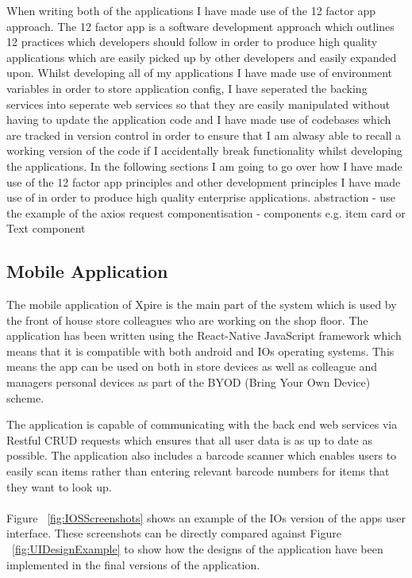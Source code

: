 \documentclass[a4paper,11pt]{report}
\begin{document}
When writing both of the applications I have made use of the 12 factor app approach. The 12 factor app is a software development approach which outlines 12 practices which developers should follow in order to produce high quality applications which are easily picked up by other developers and easily expanded upon. 
Whilst developing all of my applications I have made use of environment variables in order to store application config, I have seperated the backing services into seperate web services so that they are easily manipulated without having to update the application code and I have made use of codebases which are tracked in version control in order to ensure that I am alwasy able to recall a working version of the code if I accidentally break functionality whilst developing the applications.
In the following sections I am going to go over how I have made use of the 12 factor app principles and other development principles I have made use of in order to produce high quality enterprise applications.
abstraction - use the example of the axios request
componentisation - components e.g. item card or Text component

\subsection{Mobile Application}
The mobile application of Xpire is the main part of the system which is used by the front of house store colleagues who are working on the shop floor.
The application has been written using the React-Native JavaScript framework which means that it is compatible with both android and IOs operating systems.
This means the app can be used on both in store devices as well as colleague and managers personal devices as part of the BYOD (Bring Your Own Device) scheme. 

The application is capable of communicating with the back end web services via Restful CRUD requests which ensures that all user data is as up to date as possible.
The application also includes a barcode scanner which enables users to easily scan items rather than entering relevant barcode numbers for items that they want to look up. 
\\
\\
Figure ~\ref{fig:IOSScreenshots} shows an example of the IOs version of the apps user interface. These screenshots can be directly compared against Figure ~\ref{fig:UIDesignExample}
 to show how the designs of the application have been implemented in the final versions of the application.
\end{document}
